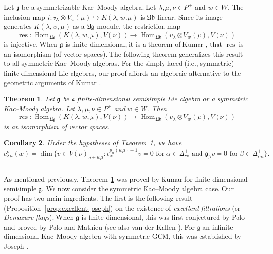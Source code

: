 \documentclass[12pt,reqno]{amsart}
\theoremstyle{plain}
\newtheorem{theorem}{Theorem}[section]
\newtheorem{corollary}[theorem]{Corollary}
\theoremstyle{definition}
\theoremstyle{remark}
\theoremstyle{plain}
\newcommand{\posreal}[1][+]{\Delta_{re}^{#1}}
\newcommand{\posimag}{\Delta_{im}^+}
\newcommand{\lie}{\mathfrak}
\newcommand{\lrw}{c_{\lambda\mu}^\nu(w)}
\DeclareMathOperator{\res}{res}
\DeclareMathOperator{\Hom}{Hom}
\begin{document}
Let $\mathfrak{g}$ be a symmetrizable Kac--Moody algebra. Let $\lambda, \mu, \nu \in P^+$ and $w \in W$. The inclusion map $i: v_\lambda \otimes V_w(\mu) \hookrightarrow K(\lambda, w, \mu)$ is $\mathfrak{Ub}$-linear. Since its image generates $K(\lambda, w, \mu)$ as a $\mathfrak{Ug}$-module, the restriction map
$$ \res:  \Hom_{\,\mathfrak{Ug}} (K(\lambda, w, \mu), V(\nu)) \to \Hom_{\,\mathfrak{Ub}} (v_\lambda \otimes V_w(\mu), V(\nu))$$
 is injective. When $\mathfrak g$ is finite-dimensional, it is a theorem of Kumar \cite{Kum1}, \cite{Kum2} that $\res$ is an isomorphism (of vector spaces). The following theorem generalizes this result to all symmetric Kac--Moody algebras. For the simply-laced (i.e., symmetric) finite-dimensional Lie algebras, our proof affords an algebraic alternative to the geometric arguments of Kumar \cite{Kum1}.

\begin{theorem}\label{thm:UbUg}
    Let $\mathfrak{g}$ be a finite-dimensional semisimple Lie algebra or a symmetric Kac--Moody algebra. Let $\lambda, \mu, \nu \in P^+$ and $w \in W$. Then 
\begin{equation} \label{eq:resmap}
     \res:  \Hom_{\,\mathfrak{Ug}} (K(\lambda, w, \mu), V(\nu)) \to \Hom_{\,\mathfrak{Ub}} (v_\lambda \otimes V_w(\mu), V(\nu))
\end{equation}
is an isomorphism of vector spaces.
\end{theorem}

\begin{corollary}
    Under the hypotheses of Theorem~\ref{thm:UbUg}, we have 
    \[\lrw = \dim \{v \in V(\nu)_{\lambda+w\mu}: e_\alpha^{p_\alpha(w\mu)+1} v =0 \text{ for } \alpha \in \posreal \text{ and } {\lie g}_{\beta} v =0 \text{ for } \beta \in \posimag\}.\]
\end{corollary}

\subsection{}\label{sec:zzz}
As mentioned previously, Theorem~\ref{thm:UbUg} was proved by Kumar for finite-dimensional semisimple $\mathfrak{g}$. We now consider the symmetric Kac--Moody algebra case. Our proof has two main ingredients. The first is the following result (Proposition~\ref{prop:excellent-joseph}) on the existence of {\em excellent filtrations} (or {\em Demazure flags}).
When $\lie g$ is finite-dimensional, this was first conjectured by Polo and proved by Polo \cite{P1} and Mathieu \cite{M3} (see also van der Kallen \cite{vdkallen-tifr}). For $\lie g$ an infinite-dimensional Kac--Moody algebra with symmetric GCM, this was established by Joseph \cite{J2}.
\end{document}
